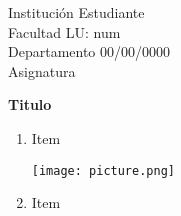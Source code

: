 \documentclass{article}
\begin{document}
\begin{flushleft}
	Institución \hfill Estudiante\\ Facultad \hfill LU: num\\ Departamento \hfill 00/00/0000\\ Asignatura
\end{flushleft}

\begin{center}\vspace{0.5cm}
\textbf{ \LARGE Titulo}
\end{center}
\begin{enumerate}
	\item{Item}
		\begin{center}
			\texttt{[image: picture.png]}
		\end{center}
		\newpage
	\item{Item}
\end{enumerate}
\end{document}

